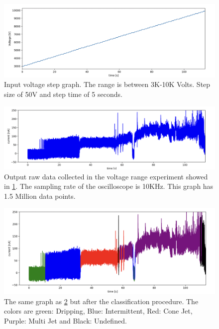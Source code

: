 \begin{figure}[H]
    \center
    \includegraphics[width=12cm]{Figuras/19:03/voltage_step.png}
    \caption{Input voltage step graph. The range is between 3K-10K Volts. Step size of 50V and step time of 5 seconds.}
    \label{fig:step_voltage}
\end{figure}


\begin{figure}[H]
    \center
    \includegraphics[width=12cm]{Figuras/19:03/raw-data-example.png}
    \caption{Output raw data collected in the voltage range experiment showed in \ref{fig:step_voltage}. The sampling rate of the oscilloscope is 10KHz. This graph has 1.5 Million data points.}
    \label{fig:raw_data}
\end{figure}

\begin{figure}[H]
    \center
    \includegraphics[width=12cm]{Figuras/19:03/classified-data-example.png}
    \caption{The same graph as \ref{fig:raw_data} but after the classification procedure. The colors are green: Dripping, Blue: Intermittent, Red: Cone Jet, Purple: Multi Jet and Black: Undefined.}
    \label{fig:class_step_data}
\end{figure}

